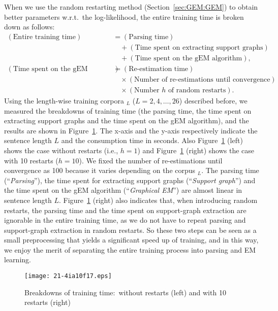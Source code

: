 \documentclass[english]{jnlp_1.4_rep}
\newcommand{\corpus}{}
\begin{document}
When we use the random restarting method (Section~\ref{sec:GEM:GEM})
to obtain better parameters w.r.t.\ the log-likelihood, the entire
training time is broken down as follows:
\begin{align*}
(\mbox{Entire training time}) & = 
	(\mbox{Parsing time})\\
  & \quad + (\mbox{Time spent on extracting support graphs})\\
  & \quad + (\mbox{Time spent on the gEM algorithm}),\\
(\mbox{Time spent on the gEM algorithm}) & = 
	(\mbox{Re-estimation time})\\
  & \quad \times (\mbox{Number of re-estimations until convergence})\\
  & \quad \times(\mbox{Number $h$ of random restarts}).
\end{align*}
Using the length-wise training corpora $\corpus_L$ ($L=2,4,\ldots,26$)
described before, we measured the breakdowns of training time
(the parsing time, the time spent on extracting support graphs and
the time spent on the gEM algorithm), and the results are shown
in Figure~\ref{graph:2}.  The x-axis and the y-axis respectively
indicate the sentence length $L$ and the consumption time in seconds.
Also Figure~\ref{graph:2} (left) shows the case without restarts
(i.e., $h=1$) and Figure~\ref{graph:2} (right) shows the case with
10 restarts ($h=10$).  We fixed the number of re-estimations
until convergence as 100 because it varies depending on the corpus
$\corpus_L$.  The parsing time (``{\it Parsing}''), the time spent
for extracting support graphs (``{\it Support graph}'') and
the time spent on the gEM algorithm (``{\it Graphical EM}'') are
almost linear in sentence length $L$.
Figure~\ref{graph:2} (right) also indicates that,
when introducing random restarts, the parsing time and
the time spent on support-graph extraction are ignorable
in the entire training time, as we do not have
to repeat parsing and support-graph extraction in random restarts.
So these two steps can be seen as a small preprocessing
that yields a significant speed up of training, and in this way,
we enjoy the merit of separating the entire training process
into parsing and EM learning.

\begin{figure}[t]
\begin{center}
\texttt{[image: 21-4ia10f17.eps]}
\end{center}
\caption{Breakdowns of training time:\ without restarts (left) and with 10 restarts (right)}
\label{graph:2}
\end{figure}
\end{document}
